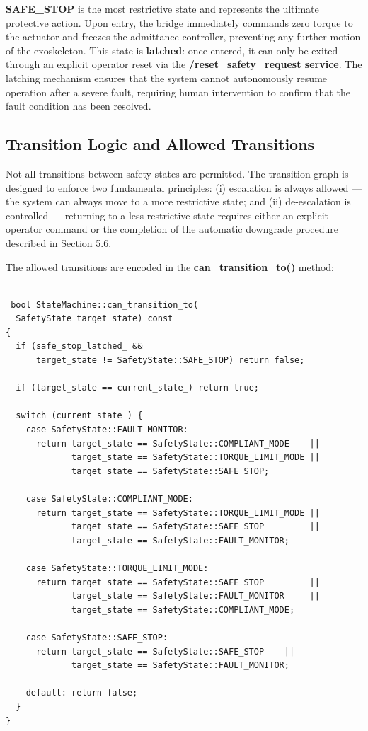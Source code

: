 \textbf{SAFE\_STOP} is the most restrictive state and represents the ultimate protective action. Upon entry, the bridge immediately commands zero torque to the actuator and freezes the admittance controller, preventing any further motion of the exoskeleton. This state is \textbf{latched}: once entered, it can only be exited through an explicit operator reset via the \textbf{/reset\_safety\_request service}. The latching mechanism ensures that the system cannot autonomously resume operation after a severe fault, requiring human intervention to confirm that the fault condition has been resolved.

\subsection{Transition Logic and Allowed Transitions}
Not all transitions between safety states are permitted. The transition graph is designed to enforce two fundamental principles: (i) escalation is always allowed — the system can always move to a more restrictive state; and (ii) de-escalation is controlled — returning to a less restrictive state requires either an explicit operator command or the completion of the automatic downgrade procedure described in Section 5.6.

The allowed transitions are encoded in the \textbf{can\_transition\_to()} method:

\begin{verbatim}

 bool StateMachine::can_transition_to(
  SafetyState target_state) const
{
  if (safe_stop_latched_ &&
      target_state != SafetyState::SAFE_STOP) return false;

  if (target_state == current_state_) return true;

  switch (current_state_) {
    case SafetyState::FAULT_MONITOR:
      return target_state == SafetyState::COMPLIANT_MODE    ||
             target_state == SafetyState::TORQUE_LIMIT_MODE ||
             target_state == SafetyState::SAFE_STOP;

    case SafetyState::COMPLIANT_MODE:
      return target_state == SafetyState::TORQUE_LIMIT_MODE ||
             target_state == SafetyState::SAFE_STOP         ||
             target_state == SafetyState::FAULT_MONITOR;

    case SafetyState::TORQUE_LIMIT_MODE:
      return target_state == SafetyState::SAFE_STOP         ||
             target_state == SafetyState::FAULT_MONITOR     ||
             target_state == SafetyState::COMPLIANT_MODE;

    case SafetyState::SAFE_STOP:
      return target_state == SafetyState::SAFE_STOP    ||
             target_state == SafetyState::FAULT_MONITOR;

    default: return false;
  }
}

\end{verbatim}


